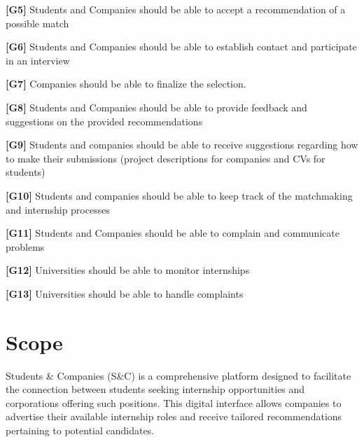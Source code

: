 \textbf{[G5]} Students and Companies should be able to accept a recommendation of a possible match

\textbf{[G6]} Students and Companies should be able to establish contact and participate in an interview

\textbf{[G7]} Companies should be able to finalize the selection.

\textbf{[G8]} Students and Companies should be able to provide feedback and suggestions on the provided recommendations 

\textbf{[G9] }Students and companies should be able to receive suggestions regarding how to make their submissions (project descriptions for companies and CVs for students)

\textbf{[G10]} Students and companies should be able to keep track of the matchmaking and internship processes

\textbf{[G11]} Students and Companies should be able to complain and communicate problems

\textbf{[G12]} Universities should be able to monitor internships

\textbf{[G13]} Universities should be able to handle complaints










\section{Scope}  
\textbf{
}
Students \& Companies (S\&C) is a comprehensive platform designed to facilitate the connection between students seeking internship opportunities and corporations offering such positions. This digital interface allows companies to advertise their available internship roles and receive tailored recommendations pertaining to potential candidates. 


